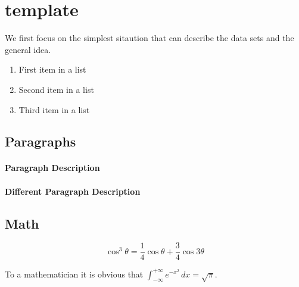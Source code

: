 \documentclass[
10pt, %
a4paper, %
oneside, %
headinclude,footinclude, %
BCOR5mm, %
]{scrartcl}
\begin{document}
\section{template}
We first focus on the simplest sitaution that can describe the data sets and the general idea.


\begin{enumerate}[noitemsep] %
\item First item in a list
\item Second item in a list
\item Third item in a list
\end{enumerate}


\subsection{Paragraphs}


\paragraph{Paragraph Description} %

\paragraph{Different Paragraph Description} %


\subsection{Math}


\begin{equation}
\cos^3 \theta =\frac{1}{4}\cos\theta+\frac{3}{4}\cos 3\theta
\label{eq:refname2}
\end{equation}


\begin{definition}[Gauss] 
To a mathematician it is obvious that
$\int_{-\infty}^{+\infty}
e^{-x^2}\,dx=\sqrt{\pi}$. 
\end{definition} 
\end{document}
